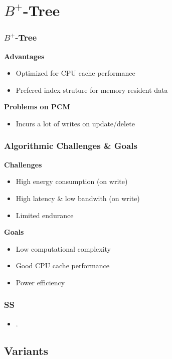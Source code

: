 \section{$B^+$-Tree}

\begin{frame}
\frametitle{$B^+$-Tree}

\textbf{Advantages}
\begin{itemize}
\item Optimized for CPU cache performance
\item Prefered index struture for memory-resident data
\end{itemize}

\textbf{Problems on PCM}
\begin{itemize}
\item Incurs a lot of writes on update/delete
\end{itemize}
\end{frame}

\begin{frame}
\frametitle{Algorithmic Challenges \& Goals}
\textbf{Challenges}
\begin{itemize}
\item High energy consumption (on write)
\item High latency \& low bandwith (on write)
\item Limited endurance
\end{itemize}

\textbf{Goals}
\begin{itemize}
\item Low computational complexity
\item Good CPU cache performance
\item Power efficiency
\end{itemize}
\end{frame}


\begin{frame}
\frametitle{SS}

\begin{itemize}
\item .
\end{itemize}

\end{frame}




\subsection{Variants}

